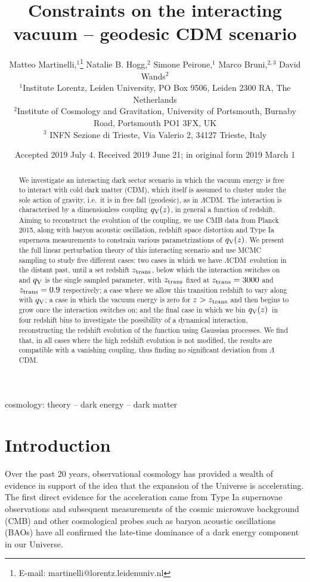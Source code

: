 \documentclass[a4paper,fleqn,usenatbib]{mnras}
\title[Constraints on  the  interacting vacuum scenario]{Constraints on  the  interacting vacuum -- geodesic CDM scenario}
\author[M. Martinelli et al.]{
Matteo Martinelli,$^{1}$\thanks{E-mail: martinelli@lorentz.leidenuniv.nl}
Natalie B. Hogg,$^{2}$
Simone Peirone,$^{1}$
Marco Bruni,$^{2,3}$
David Wands$^{2}$
\\
$^{1}$Institute Lorentz, Leiden University, PO Box 9506, Leiden 2300 RA, The Netherlands \\
$^{2}$Institute  of  Cosmology  and  Gravitation,  University  of  Portsmouth, Burnaby  Road,  Portsmouth  PO1  3FX, UK\\
$^3$ INFN Sezione di Trieste, Via Valerio 2, 34127 Trieste, Italy
}
\date{Accepted 2019 July 4. Received 2019 June 21; in original form 2019 March 1}
\newcommand*{\qv}{$q_{\rm V}(z)$}
\newcommand*{\LCDM}{$\Lambda$CDM}
\begin{document}
\label{firstpage}
\pagerange{\pageref{firstpage}--\pageref{lastpage}}
\maketitle

\begin{abstract}
We investigate an interacting dark sector scenario in which the vacuum energy is free to interact with cold dark matter (CDM), which itself is assumed to  cluster under the sole action of gravity, i.e.\ it is in free fall (geodesic), as in $\Lambda$CDM. The interaction is characterised by a dimensionless coupling \qv, in general a function of redshift. Aiming to reconstruct the evolution of the coupling, we use CMB data from Planck 2015, along with baryon acoustic oscillation, redshift space distortion and Type Ia supernova measurements  to constrain various parametrizations of $q_{\rm V}(z)$. We present the full linear perturbation theory of this interacting scenario and use MCMC sampling to study five different cases: two cases in which we have \LCDM~evolution in the distant past, until a set redshift $z_{\rm trans}$, below which the interaction switches on and $q_{\rm V}$ is the single sampled parameter, with $z_{\rm trans}$ fixed at $z_{\rm trans}=3000$ and $z_{\rm trans}=0.9$ respectively; a case where we allow this transition redshift to vary along with $q_{\rm V}$; a case in which the vacuum energy is zero for  $z>z_{\rm trans}$ and then begins to grow once the interaction switches on; and the final case in which we bin \qv~in four redshift bins to investigate the possibility of a dynamical interaction, reconstructing the redshift evolution of the function using Gaussian processes. We find that, in all cases where the high redshift evolution is not modified, the results are compatible with a vanishing coupling, thus finding no significant deviation from \LCDM.

\end{abstract}

\begin{keywords}
cosmology: theory -- dark energy -- dark matter
\end{keywords}



\section{Introduction} \label{sec:intro}
Over the past 20 years, observational cosmology has provided a wealth of evidence in support of the idea that the expansion of the Universe is accelerating. The first direct evidence for the acceleration came from  Type Ia supernovae observations \citep{Riess1998,Perlmutter1999} and subsequent measurements of the cosmic microwave background (CMB) \citep{Hinshaw2009, Aghanim:2018eyx} and other cosmological probes such as baryon acoustic oscillations (BAOs) \citep{Alam:2016hwk} have all confirmed the late-time dominance of a dark energy component in our Universe.
\end{document}
